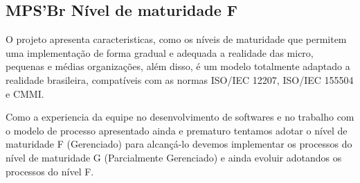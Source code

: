 \documentclass[	DIV=calc,%
							paper=a4,%
							fontsize=12pt,%
							onecolumn]{scrartcl}	 					%
\begin{document}
\subsection{MPS'Br Nível de maturidade F}
    O projeto apresenta caracteristicas, como os níveis de maturidade que permitem uma implementação de forma gradual e adequada a realidade das micro, pequenas e médias organizações, além disso, é um modelo totalmente adaptado a realidade brasileira, compatíveis com as normas ISO/IEC 12207, ISO/IEC 155504 e CMMI.

Como a experiencia da equipe no desenvolvimento de softwares e no trabalho com o modelo de processo apresentado ainda e prematuro tentamos adotar o nível de maturidade F (Gerenciado) para alcançá-lo devemos implementar os processos do nível de maturidade G (Parcialmente Gerenciado) e ainda evoluir adotandos os processos do nível F.
\end{document}
